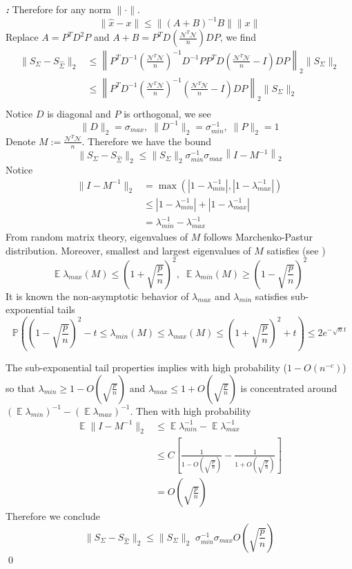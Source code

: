 \documentclass[12pt]{extarticle}
\renewenvironment{proof}[1][\proofname]{ { \it\bfseries #1: }}{\qed}
\newcommand{\cN}{{\mathcal{N}}}
\newcommand{\field}[1]{\mathbb{#1}}
\newcommand{\p}{\field{P}}
\newcommand{\1}{\mathbbm{1}}
\DeclareMathOperator{\E}{\mathbb{E}}
\numberwithin{equation}{section}
\begin{document}
\begin{proof}
Therefore for any norm $\|\cdot \|$.
\[
\|\hat{x} -x\| \le \|(A+B)^{-1} B \| \|x \|
\]
Replace $A= P^TD^2P$ and $A+B=P^T D \left( \frac{\cN^T\cN}{n}\right) DP$, we find 
\begin{align*}
    \|S_{\Sigma} - S_{\hat{\Sigma}} \|_2 & \le \left\| P^T D^{-1} \left( \frac{\cN^T\cN}{n}\right)^{-1} D^{-1} P  P^T D \left( \frac{\cN^T\cN}{n}-I\right) DP \right\|_2 \|S_{\Sigma}\|_2 \\
    & \le \left\| P^T D^{-1} \left( \frac{\cN^T\cN}{n}\right)^{-1} \left( \frac{\cN^T\cN}{n}-I\right) DP \right\|_2 \|S_{\Sigma}\|_2 \\
\end{align*}
Notice $D$ is diagonal and $P$ is orthogonal, we see 
\[
  \|D\|_2= \sigma_{max},  \; \|D^{-1}\|_2= \sigma_{min}^{-1}, \; \|P\|_2 =1
\]
Denote $M:= \frac{\cN^T\cN}{n}$. Therefore we have the bound 
\[
\|S_{\Sigma} - S_{\hat{\Sigma}} \|_2 \le \|S_{\Sigma}\|_2  \sigma_{min}^{-1} \sigma_{max} \left\| I-M^{-1} \right\|_2 
\]
Notice 
\begin{align*}
    \|I-M^{-1}\|_2 & = \max (|1-\lambda_{min}^{-1}|, |1-\lambda_{max}^{-1}|) \\
    & \le |1-\lambda_{min}^{-1}|+ |1-\lambda_{max}^{-1}| \\
    & = \lambda_{min}^{-1} - \lambda_{max}^{-1}
\end{align*}
From random matrix theory, eigenvalues of $M$ follows Marchenko-Pastur distribution. Moreover, smallest and largest eigenvalues of $M$ satisfies (see \cite{rudelson2010non})
\[
\E \lambda_{max}(M) \le \left(1+\sqrt{\frac{p}{n}}\right)^2, \; \E \lambda_{min}(M) \ge \left(1-\sqrt{\frac{p}{n}}\right)^2
\]
It is known the non-asymptotic behavior of $\lambda_{max}$ and $\lambda_{min}$ satisfies sub-exponential tails
\[
\p \left( \left(1-\sqrt{\frac{p}{n}}\right)^2 -t\le \lambda_{min}(M) \le \lambda_{max}(M) \le \left(1+\sqrt{\frac{p}{n}}\right)^2 +t\right) \le 2e^{-\sqrt{n}t}
\]

The sub-exponential tail properties implies with high probability ($1-O(n^{-c})$) so that $\lambda_{min}\ge 1-O(\sqrt{\frac{p}{n}})$ and $\lambda_{max}\le 1+O(\sqrt{\frac{p}{n}})$ is concentrated  around $(\E \lambda_{min})^{-1}- (\E \lambda_{max})^{-1} $. Then  with high probability
\begin{align*}
    \E \|I-M^{-1}\|_2 
    &\le \E \lambda_{min}^{-1} - \E \lambda_{max}^{-1} \\
    & \le C\left[\frac{1}{1-O(\sqrt{\frac{p}{n}})} - \frac{1}{1+O(\sqrt{\frac{p}{n}})} \right] \\
    &= O(\sqrt{\frac{p}{n}})
\end{align*}
Therefore we conclude
\[
\|S_{\Sigma} - S_{\hat{\Sigma}} \|_2  \le   \|S_{\Sigma}\|_2 \; \sigma_{min}^{-1} \sigma_{max}  O(\sqrt{\frac{p}{n}})
\]
\end{proof}
\end{document}
